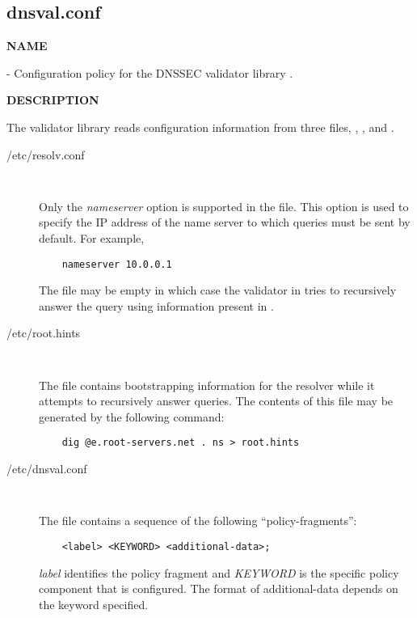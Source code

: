 \clearpage

\subsection{\bf dnsval.conf}

{\bf NAME}

 - Configuration policy for the DNSSEC validator
library .

{\bf DESCRIPTION}

The validator library reads configuration information from three files,
, , and .

\begin{description}

\item [/etc/resolv.conf]\verb" "

Only the {\it nameserver} option is supported in the  file.
This option is used to specify the IP address of the name server to which
queries must be sent by default.  For example,

\begin{verbatim}
    nameserver 10.0.0.1
\end{verbatim}

The  file may be empty in which case the validator in
 tries to recursively answer the query using information
present in .

\item [/etc/root.hints]\verb" "

The  file contains bootstrapping information for the
resolver while it attempts to recursively answer queries.  The contents of
this file may be generated by the following command:

\begin{verbatim}
    dig @e.root-servers.net . ns > root.hints
\end{verbatim}

\item [/etc/dnsval.conf]\verb" "

The  file contains a sequence of the following
``policy-fragments'':

\begin{verbatim}
    <label> <KEYWORD> <additional-data>; 
\end{verbatim}

{\it label} identifies the policy fragment 
and {\it KEYWORD} is the specific policy component that is 
configured.  The format of additional-data depends on the 
keyword specified.


\end{description}
